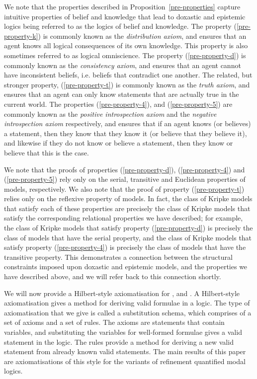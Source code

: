 We note that the properties described in Proposition~\ref{pre-properties}
capture intuitive properties of belief and knowledge that lead to doxastic and
epistemic logics being referred to as the logics of belief and knowledge. The
property (\ref{pre-property-k}) is commonly known as the {\em distribution
axiom}, and ensures that an agent knows all logical consequences of its own
knowledge.  This property is also sometimes referred to as logical omniscience.
The property (\ref{pre-property-d}) is commonly known as the {\em consistency
axiom}, and ensures that an agent cannot have inconsistent beliefs, i.e. beliefs
that contradict one another.  The related, but stronger property,
(\ref{pre-property-t}) is commonly known as the {\em truth axiom}, and ensures
that an agent can only know statements that are actually true in the current
world. The properties (\ref{pre-property-4}), and (\ref{pre-property-5}) are
commonly known as the {\em positive introspection axiom} and the {\em negative
introspection axiom} respectively, and ensures that if an agent knows (or
believes) a statement, then they know that they know it (or believe that they
believe it), and likewise if they do not know or believe a statement, then they
know or believe that this is the case.

We note that the proofs of properties (\ref{pre-property-d}),
(\ref{pre-property-4}) and (\ref{pre-property-5}) rely only on the serial,
transitive and Euclidean properties of \classKD{} models, respectively. We also
note that the proof of property (\ref{pre-property-t}) relies only on the
reflexive property of \classS{} models. In fact, the class of Kripke models that
satisfy each of these properties are precisely the class of Kripke models that
satisfy the corresponding relational properties we have described; for example,
the class of Kripke models that satisfy property (\ref{pre-property-d}) is
precisely the class of models that have the serial property, and the class of
Kripke models that satisfy property (\ref{pre-property-4}) is precisely the
class of models that have the transitive property. This demonstrates a
connection between the structural constraints imposed upon doxastic and
epistemic models, and the properties we have described above, and we will refer
back to this connection shortly.

We will now provide a Hilbert-style axiomatisation for \logicK{}, \logicKD{} and
\logicS{}. A Hilbert-style axiomatisation gives a method for deriving valid
formulae in a logic. The type of axiomatisation that we give is called a
substitution schema, which comprises of a set of axioms and a set of rules. The
axioms are statements that contain variables, and substituting the variables for
well-formed formulae gives a valid statement in the logic. The rules provide a
method for deriving a new valid statement from already known valid statements.
The main results of this paper are axiomatisations of this style for the
variants of refinement quantified modal logics.
 
